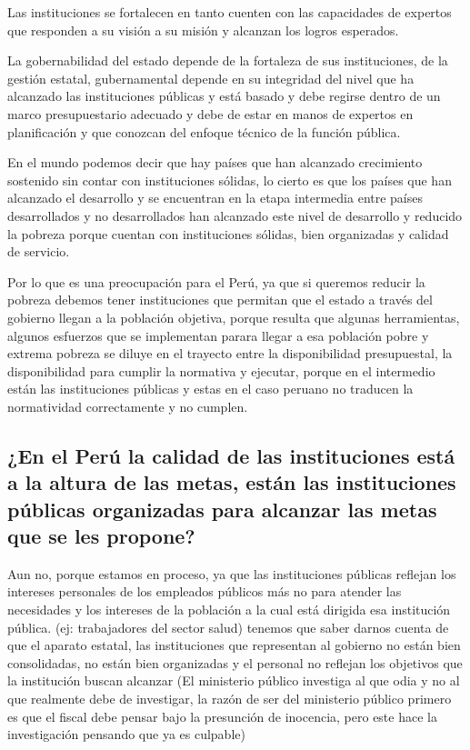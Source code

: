 \documentclass[
  jou,
  floatsintext,
  longtable,
  a4paper,
  nolmodern,
  notxfonts,
  notimes,
  12pt,
  colorlinks=true,linkcolor=blue,citecolor=blue,urlcolor=blue]{apa7}
\begin{document}
Las instituciones se fortalecen en tanto cuenten con las capacidades de
expertos que responden a su visión a su misión y alcanzan los logros
esperados.

La gobernabilidad del estado depende de la fortaleza de sus
instituciones, de la gestión estatal, gubernamental depende en su
integridad del nivel que ha alcanzado las instituciones públicas y está
basado y debe regirse dentro de un marco presupuestario adecuado y debe
de estar en manos de expertos en planificación y que conozcan del
enfoque técnico de la función pública.

En el mundo podemos decir que hay países que han alcanzado crecimiento
sostenido sin contar con instituciones sólidas, lo cierto es que los
países que han alcanzado el desarrollo y se encuentran en la etapa
intermedia entre países desarrollados y no desarrollados han alcanzado
este nivel de desarrollo y reducido la pobreza porque cuentan con
instituciones sólidas, bien organizadas y calidad de servicio.

Por lo que es una preocupación para el Perú, ya que si queremos reducir
la pobreza debemos tener instituciones que permitan que el estado a
través del gobierno llegan a la población objetiva, porque resulta que
algunas herramientas, algunos esfuerzos que se implementan parara llegar
a esa población pobre y extrema pobreza se diluye en el trayecto entre
la disponibilidad presupuestal, la disponibilidad para cumplir la
normativa y ejecutar, porque en el intermedio están las instituciones
públicas y estas en el caso peruano no traducen la normatividad
correctamente y no cumplen.

\subsection{¿En el Perú la calidad de las instituciones está a la altura
de las metas, están las instituciones públicas organizadas para alcanzar
las metas que se les
propone?}\label{en-el-peruxfa-la-calidad-de-las-instituciones-estuxe1-a-la-altura-de-las-metas-estuxe1n-las-instituciones-puxfablicas-organizadas-para-alcanzar-las-metas-que-se-les-propone}

Aun no, porque estamos en proceso, ya que las instituciones públicas
reflejan los intereses personales de los empleados públicos más no para
atender las necesidades y los intereses de la población a la cual está
dirigida esa institución pública. (ej: trabajadores del sector salud)
tenemos que saber darnos cuenta de que el aparato estatal, las
instituciones que representan al gobierno no están bien consolidadas, no
están bien organizadas y el personal no reflejan los objetivos que la
institución buscan alcanzar (El ministerio público investiga al que odia
y no al que realmente debe de investigar, la razón de ser del ministerio
público primero es que el fiscal debe pensar bajo la presunción de
inocencia, pero este hace la investigación pensando que ya es culpable)
\end{document}
